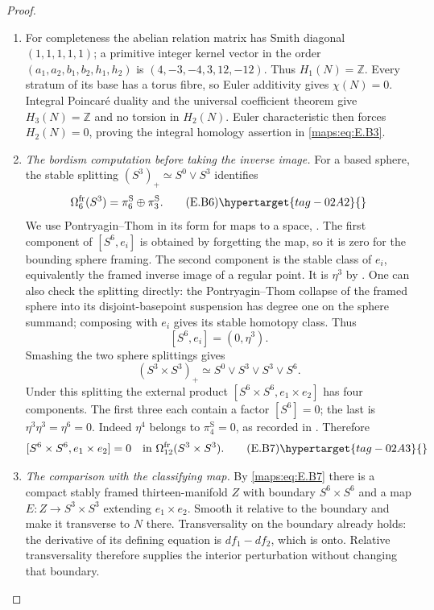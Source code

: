 \begin{proof}
\begin{enumerate}[label={$\langle1\rangle$\arabic*.},leftmargin=*]
\item For completeness the abelian relation matrix has Smith
diagonal $(1,1,1,1,1)$; a primitive integer kernel vector in
the order $(a_1,a_2,b_1,b_2,h_1,h_2)$ is
$(4,-3,-4,3,12,-12)$. Thus $H_1(N)=\mathbb Z$.
Every stratum of its base has a torus fibre, so Euler
additivity gives $\chi(N)=0$. Integral Poincar\'e duality and
the universal coefficient theorem give $H_3(N)=\mathbb Z$
and no torsion in $H_2(N)$. Euler characteristic then forces
$H_2(N)=0$, proving the integral homology assertion in \eqref{maps:eq:E.B3}.

\item \emph{The bordism computation before taking the inverse image.}
For a based sphere, the stable splitting
$(S^3)_+\simeq S^0\vee S^3$ identifies
\[
 \Omega^{\mathrm{fr}}_6(S^3)
       =\pi^{\mathrm S}_6\oplus\pi^{\mathrm S}_3.
 \tag{E.B6}\hypertarget{tag-02A2}{}\label{maps:eq:E.B6}
\]
We use Pontryagin--Thom in its form for maps to a space,
\cite[Definition 8.16 and Theorem 8.17]{rootDavisKirk01}.
The first component of $[S^6,e_i]$ is obtained by forgetting
the map, so it is zero for the bounding sphere framing.
The second component is the stable class of $e_i$, equivalently
the framed inverse image of a regular point. It is $\eta^3$
by . One can also check the splitting directly: the
Pontryagin--Thom collapse of the framed sphere into its
disjoint-basepoint suspension has degree one on the sphere
summand; composing with $e_i$ gives its stable homotopy class.
Thus
\[
                         [S^6,e_i]=(0,\eta^3).
\]
Smashing the two sphere splittings gives
\[
 (S^3\times S^3)_+\simeq
       S^0\vee S^3\vee S^3\vee S^6.
\]
Under this splitting the external product
$[S^6\times S^6,e_1\times e_2]$ has four components.
The first three each contain a factor $[S^6]=0$; the last
is $\eta^3\eta^3=\eta^6=0$. Indeed $\eta^4$ belongs to
$\pi^{\mathrm S}_4=0$, as recorded in
\cite[Corollary~1.3 and Table~1, pp.~112--113]{IsaksenWangXu2023}. Therefore
\[
 [S^6\times S^6,e_1\times e_2]=0
      \quad\hbox{in }\Omega^{\mathrm{fr}}_{12}(S^3\times S^3).
 \tag{E.B7}\hypertarget{tag-02A3}{}\label{maps:eq:E.B7}
\]


\item \emph{The comparison with the classifying map.}
By \eqref{maps:eq:E.B7} there is a compact stably framed thirteen-manifold
$Z$ with boundary $S^6\times S^6$ and a map
$E:Z\to S^3\times S^3$ extending $e_1\times e_2$.
Smooth it relative to the boundary and make it transverse
to $N$ there. Transversality on the boundary already holds:
the derivative of its defining equation is $df_1-df_2$,
which is onto. Relative transversality therefore supplies
the interior perturbation without changing that boundary.


\end{enumerate}
\end{proof}
